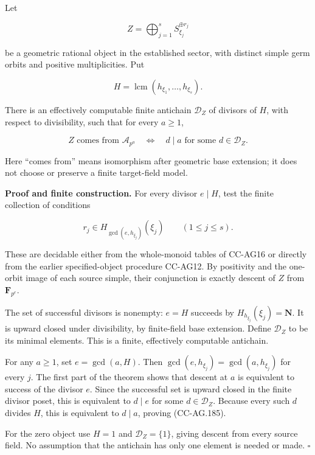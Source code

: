 Let

\[
                  Z=\bigoplus_{j=1}^s S_{\xi_j}^{\oplus r_j}
 \tag{CC-AG.183}
\]

be a geometric rational object in the established sector, with distinct
simple germ orbits and positive multiplicities. Put

\[
                              H=\operatorname{lcm}(h_{\xi_1},\ldots,h_{\xi_s}).
 \tag{CC-AG.184}
\]

There is an effectively computable finite antichain \(\mathcal D_Z\) of
divisors of \(H\), with respect to divisibility, such that for every
\(a\ge1\),

\[
 Z\text{ comes from }\mathcal A_{p^a}
       \quad\Longleftrightarrow\quad
                 d\mid a\text{ for some }d\in\mathcal D_Z.
 \tag{CC-AG.185}
\]

Here ``comes from'' means isomorphism after geometric base extension; it
does not choose or preserve a finite target-field model.

\textbf{Proof and finite construction.} For every divisor \(e\mid H\),
test the finite collection of conditions

\[
                r_j\in H_{\gcd(e,h_{\xi_j})}(\xi_j)
                         \qquad(1\le j\le s).
 \tag{CC-AG.186}
\]

These are decidable either from the whole-monoid tables of CC-AG16 or
directly from the earlier specified-object procedure CC-AG12. By
positivity and the one-orbit image of each source simple, their
conjunction is exactly descent of \(Z\) from \(\mathbf F_{p^e}\).

The set of successful divisors is nonempty: \(e=H\) succeeds by
\(H_{h_{\xi_j}}(\xi_j)=\mathbf N\). It is upward closed under
divisibility, by finite-field base extension. Define \(\mathcal D_Z\) to
be its minimal elements. This is a finite, effectively computable
antichain.

For any \(a\ge1\), set \(e=\gcd(a,H)\). Then
\(\gcd(e,h_{\xi_j})=\gcd(a,h_{\xi_j})\) for every \(j\). The first part
of the theorem shows that descent at \(a\) is equivalent to success of
the divisor \(e\). Since the successful set is upward closed in the
finite divisor poset, this is equivalent to \(d\mid e\) for some
\(d\in\mathcal D_Z\). Because every such \(d\) divides \(H\), this is
equivalent to \(d\mid a\), proving (CC-AG.185).

For the zero object use \(H=1\) and \(\mathcal D_Z=\{1\}\), giving
descent from every source field. No assumption that the antichain has
only one element is needed or made. \(\square\)

